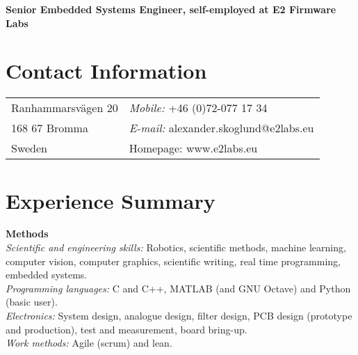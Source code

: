 \documentclass[a4paper,margin,line]{res} \usepackage{latexsym}
\begin{document}
\vspace*{.1in} 

\begin{resume}
\hspace{-34mm}
{\bf \large Senior Embedded Systems Engineer, self-employed at E2 Firmware Labs}


\section{\sc Contact Information}
\vspace{.05in}
\begin{tabular}{@{}p{3in}p{3in}}
  Ranhammarsv\"agen 20 & {\it Mobile:} +46 (0)72-077 17 34 \\
  168 67 Bromma & {\it E-mail:} alexander.skoglund@e2labs.eu \\
  Sweden & Homepage: www.e2labs.eu \\
\end{tabular}



\section{\sc Experience Summary}

{\bf Methods}\\ {\em Scientific and engineering skills:} Robotics,
scientific methods, machine learning, computer vision, computer
graphics, scientific writing, real time programming, embedded
systems.\\ {\em Programming languages:} C and C++, {M}ATLAB (and GNU
Octave) and Python (basic user). \\ {\em Electronics:} System design,
analogue design, filter design, PCB design (prototype and production),
test and measurement, board bring-up.\\ {\em Work methods:} Agile
(scrum) and lean.


\end{resume}
\end{document}
